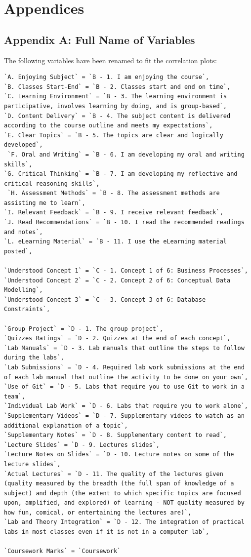 \documentclass[
]{article}
\begin{document}
\newpage

\section{Appendices}\label{appendices}

\subsection{Appendix A: Full Name of
Variables}\label{appendix-a-full-name-of-variables}

The following variables have been renamed to fit the correlation plots:

\begin{verbatim}
`A. Enjoying Subject` = `B - 1. I am enjoying the course`,
`B. Classes Start-End` = `B - 2. Classes start and end on time`,
`C. Learning Environment` = `B - 3. The learning environment is participative, involves learning by doing, and is group-based`,
`D. Content Delivery` = `B - 4. The subject content is delivered according to the course outline and meets my expectations`,
`E. Clear Topics` = `B - 5. The topics are clear and logically developed`,
 `F. Oral and Writing` = `B - 6. I am developing my oral and writing skills`,
`G. Critical Thinking` = `B - 7. I am developing my reflective and critical reasoning skills`,
 `H. Assessment Methods` = `B - 8. The assessment methods are assisting me to learn`,
`I. Relevant Feedback` = `B - 9. I receive relevant feedback`,
`J. Read Recommendations` = `B - 10. I read the recommended readings and notes`,
`L. eLearning Material` = `B - 11. I use the eLearning material posted`,

`Understood Concept 1` = `C - 1. Concept 1 of 6: Business Processes`,
`Understood Concept 2` = `C - 2. Concept 2 of 6: Conceptual Data Modelling`,
`Understood Concept 3` = `C - 3. Concept 3 of 6: Database Constraints`,

`Group Project` = `D - 1. The group project`,
`Quizzes Ratings` = `D - 2. Quizzes at the end of each concept`,
`Lab Manuals` = `D - 3. Lab manuals that outline the steps to follow during the labs`,
`Lab Submissions` = `D - 4. Required lab work submissions at the end of each lab manual that outline the activity to be done on your own`,
`Use of Git` = `D - 5. Labs that require you to use Git to work in a team`,
`Individual Lab Work` = `D - 6. Labs that require you to work alone`,
`Supplementary Videos` = `D - 7. Supplementary videos to watch as an additional explanation of a topic`,
`Supplementary Notes` = `D - 8. Supplementary content to read`,
`Lecture Slides` = `D - 9. Lectures slides`,
`Lecture Notes on Slides` = `D - 10. Lecture notes on some of the lecture slides`,
`Actual Lectures` = `D - 11. The quality of the lectures given (quality measured by the breadth (the full span of knowledge of a subject) and depth (the extent to which specific topics are focused upon, amplified, and explored) of learning - NOT quality measured by how fun, comical, or entertaining the lectures are)`,
`Lab and Theory Integration` = `D - 12. The integration of practical labs in most classes even if it is not in a computer lab`,

`Coursework Marks` = `Coursework`
\end{verbatim}
\end{document}
